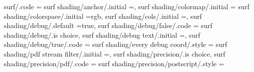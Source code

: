 surf/.code                                                         ={                                                                                                                                 
surf shading/anchor/.initial                                       =\pgfpointorigin,%
surf shading/colormap/.initial                                     ={                                                                                                                                 
surf shading/colorspace/.initial                                   =rgb,%
surf shading/cols/.initial                                         =,                                                                                                                                 
surf shading/debug/.default                                        =true,                                                                                                                              
surf shading/debug/false/.code                                     ={                                                                                                                                 
surf shading/debug/.is choice,
surf shading/debug text/.initial                                   =\the\c@pgfplotslibrarysurf@no,                                                                                                     
surf shading/debug/true/.code                                      ={                                                                                                                                 
surf shading/every debug coord/.style                              ={                                                                                                                                  
surf shading/pdf stream filter/.initial                            =,                                                                                                                                 
surf shading/precision/.is choice,
surf shading/precision/pdf/.code                                   ={                                                                                                                                 
surf shading/precision/postscript/.style                           ={                                                                                                                                 
}}}}}}}
